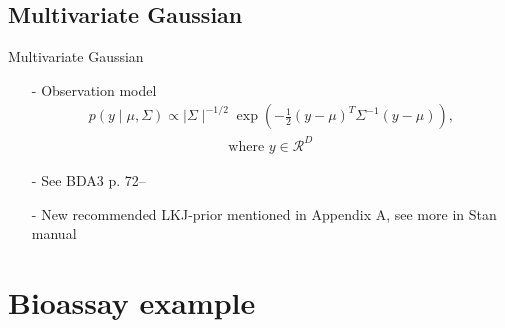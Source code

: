 \documentclass[10pt]{beamer}
\begin{document}
\subsection{Multivariate Gaussian}

\begin{frame}{Multivariate Gaussian}

  \begin{itemize}
  \item[-] Observation model
    \begin{align*}
      p(y \mid \mu,\Sigma)\propto  \mid \Sigma \mid ^{-1/2}
      \exp\left( -\frac{1}{2} (y-\mu)^T \Sigma^{-1} (y-\mu)\right),
    \end{align*}
    \begin{align*}
      \text{where } y \in \mathcal{R}^D\,
    \end{align*}
  \item[-] See BDA3 p. 72--
  \item[-] New recommended LKJ-prior mentioned in Appendix A, see more
    in Stan manual
  \end{itemize}
\end{frame}

\section{Bioassay example}
\end{document}
